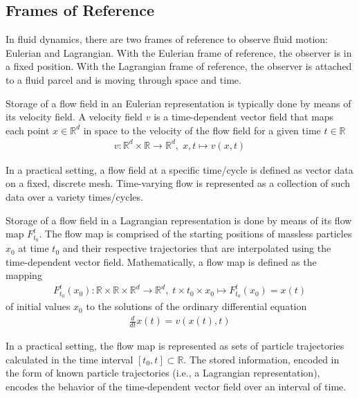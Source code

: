 \setlength{\belowdisplayskip}{3pt} \setlength{\belowdisplayshortskip}{3pt}
\setlength{\abovedisplayskip}{3pt} \setlength{\abovedisplayshortskip}{3pt}

\subsection{Frames of Reference}
%
In fluid dynamics, there are two frames of reference to observe fluid motion: Eulerian and Lagrangian.
%
With the Eulerian frame of reference, the observer is in a fixed position.
%
With the Lagrangian frame of reference, the observer is attached to a fluid parcel and is moving through space and time.

%
Storage of a flow field in an Eulerian representation is typically done by means of its velocity field.
%
A velocity field $v$ is a time-dependent vector field that maps each point $x\in \mathbb R^d$ in space to the velocity of the flow field for a given time $t\in \mathbb R$
%
\begin{eqnarray}
{v} : \mathbb R^d \times \mathbb R \to \mathbb R^d,\; x,t \mapsto v(x,t)
\end{eqnarray}

%
In a practical setting, a flow field at a specific time/cycle is defined as vector data on a fixed, discrete mesh.
%
Time-varying flow is represented as a collection of such data over a variety times/cycles.


Storage of a flow field in a Lagrangian representation is done by means of its flow map $F_{t_0}^{t}$.
%
The flow map is comprised of the starting positions of massless particles $x_0$ at time $t_0$ and their respective trajectories that are interpolated using the time-dependent vector field.
%
Mathematically, a flow map is defined as the mapping
\begin{eqnarray}
F_{t_0}^{t}(x_0):\mathbb R \times \mathbb R \times \mathbb R^d \to \mathbb R^d,\; t \times t_0 \times x_0 \mapsto F_{t_0}^{t}(x_0) = x(t)
\end{eqnarray}
%
of initial values $x_0$ to the solutions of the ordinary differential equation
%
\begin{eqnarray}
\frac{d}{dt}x(t) = v(x(t),t)
\end{eqnarray}

In a practical setting, the flow map is represented as sets of particle trajectories calculated in the time interval $[t_0,t]\subset \mathbb R$.
%
The stored information, encoded in the form of known particle trajectories (i.e., a Lagrangian representation), encodes the behavior of the time-dependent vector field over an interval of time.
%
%
%
%

